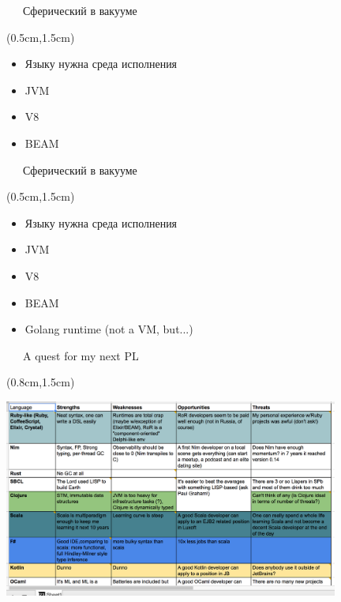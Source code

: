\documentclass[xetex,18pt,aspectratio=43]{beamer}
\begin{document}
\begin{Large}
\begin{frame}{\ \ \ Сферический в вакууме}
\begin{textblock*}{\framewidth}(0.5cm,1.5cm)
\begin{itemize}
  \item Языку нужна среда исполнения
  \item JVM
  \item V8
  \item BEAM
\end{itemize}
\end{textblock*}
\end{frame}

\begin{frame}{\ \ \ Сферический в вакууме}
\begin{textblock*}{\framewidth}(0.5cm,1.5cm)
\begin{itemize}
  \item Языку нужна среда исполнения
  \item JVM
  \item V8
  \item BEAM
  \item Golang runtime (not a VM, but...)
\end{itemize}
\end{textblock*}
\end{frame}

\begin{frame}{\ \ \ A quest for my next PL}
\begin{textblock*}{\framewidth}(0.8cm,1.5cm)
  \href{https://goo.gl/MS1UfB}{\color{blue}{https://goo.gl/MS1UfB}}\\
\begin{minipage}{\textwidth}
  \centering
  \includegraphics[height=6.5cm]{img/quest.png}
\end{minipage}
\end{textblock*}
\end{frame}


\end{Large}
\end{document}
